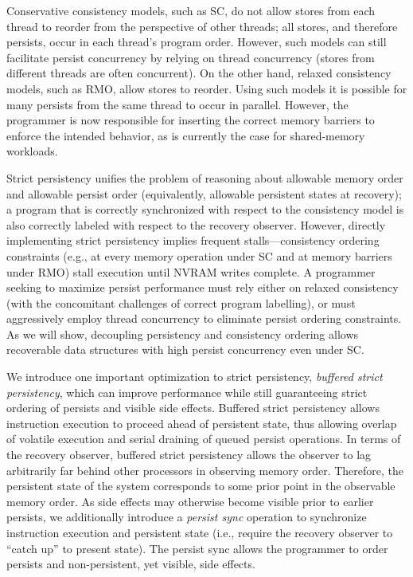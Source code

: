 Conservative consistency models, such as SC, do not allow stores from each thread to reorder from the perspective of other threads; all stores, and therefore persists, occur in each thread's program order.
However, such models can still facilitate persist concurrency by relying on thread concurrency (stores from different threads are often concurrent).
On the other hand, relaxed consistency models, such as RMO, allow stores to reorder.
Using such models it is possible for many persists from the same thread to occur in parallel.
However, the programmer is now responsible for inserting the correct memory barriers to enforce the intended behavior, as is currently the case for shared-memory workloads.

Strict persistency unifies the problem of reasoning about allowable memory order and allowable persist order (equivalently, allowable persistent states at recovery); a program that is correctly synchronized with respect to the consistency model is also correctly labeled with respect to the recovery observer.
However, directly implementing strict persistency implies frequent stalls---consistency ordering constraints (e.g., at every memory operation under SC and at memory barriers under RMO) stall execution until NVRAM writes complete. 
A programmer seeking to maximize persist performance must rely either on relaxed consistency (with the concomitant challenges of correct program labelling), or must aggressively employ thread concurrency to eliminate persist ordering constraints.
As we will show, decoupling persistency and consistency ordering allows recoverable data structures with high persist concurrency even under SC.

We introduce one important optimization to strict persistency, \emph{buffered strict persistency}, which can improve performance while still guaranteeing strict ordering of persists and visible side effects.  
Buffered strict persistency allows instruction execution to proceed ahead of persistent state, thus allowing overlap of volatile execution and serial draining of queued persist operations.
In terms of the recovery observer, buffered strict persistency allows the observer to lag arbitrarily far behind other processors in observing memory order.
Therefore, the persistent state of the system corresponds to some prior point in the observable memory order.
As side effects may otherwise become visible prior to earlier persists, we additionally introduce a \emph{persist sync} operation to synchronize instruction execution and persistent state (i.e., require the recovery observer to ``catch up'' to present state). 
The persist sync allows the programmer to order persists and non-persistent, yet visible, side effects.

